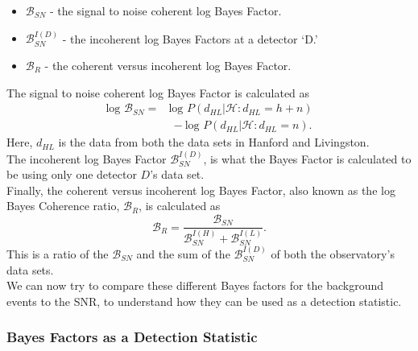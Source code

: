 \documentclass{article}
\begin{document}
\begin{itemize}
	\item  $\mathcal{B}_{SN}$ - the signal to noise coherent log Bayes Factor.
	\item  $\mathcal{B}_{SN}^{I(D)}$ - the incoherent log Bayes Factors at a detector `D.'
	\item  $\mathcal{B}_{R}$ - the coherent versus incoherent log Bayes Factor.
\end{itemize}

The signal to noise coherent log Bayes Factor is calculated as 
\begin{align} \label{eq:logBayesFactor}
\text{log }\mathcal{B}_{SN} =& \text{log }P(d_{HL} | \mathcal{H} : d_{HL} = h + n)  \nonumber\\ 
&\ - \text{log }P(d_{HL} | \mathcal{H} : d_{HL} =  n) .
\end{align}
Here, $d_{HL}$ is the data from both the data sets in Hanford and Livingston. \\


The incoherent log Bayes Factor $\mathcal{B}_{SN}^{I(D)}$,  is what the Bayes Factor is calculated to be using only one detector $D$'s data set. \\ 

Finally, the coherent versus incoherent log Bayes Factor, also known as the log Bayes Coherence ratio, $\mathcal{B}_{R}$,  is calculated as 
 \begin{equation}\label{eq:BCR}
 \mathcal{B}_{R} = \frac{\mathcal{B}_{SN}}{\mathcal{B}_{SN}^{I(H)}+\mathcal{B}_{SN}^{I(L)}}.
 \end{equation}
This is a ratio of the $\mathcal{B}_{SN}$ and the sum of the $\mathcal{B}_{SN}^{I(D)}$ of both the observatory's data sets.\\

We can now try to compare these different Bayes factors for the background events to the SNR, to understand how they can be used as a detection statistic. \\



        
 \subsubsection{Bayes Factors as a Detection Statistic}
 
\end{document}
